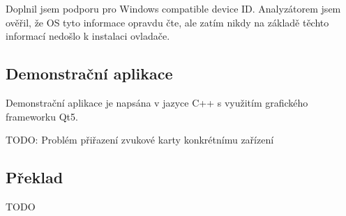 Doplnil jsem podporu pro Windows compatible device ID. Analyzátorem jsem ověřil, že OS tyto informace opravdu čte, ale zatím nikdy na základě těchto informací nedošlo k instalaci ovladače.

\subsection{Demonstrační aplikace}
Demonstrační aplikace je napsána v jazyce C++ s využitím grafického frameworku Qt5.

TODO: Problém přiřazení zvukové karty konkrétnímu zařízení

\subsection{Překlad}
TODO